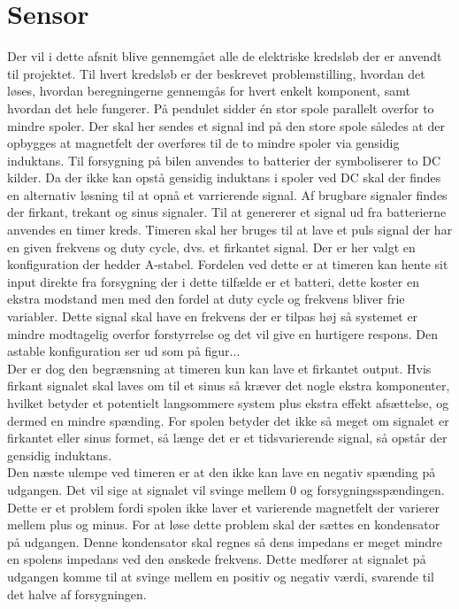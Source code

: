 \chapter{Sensor}\label{kap:chap_sensor}


Der vil i dette afsnit blive gennemgået alle de elektriske kredsløb der er anvendt til projektet. Til hvert kredsløb er der beskrevet problemstilling, hvordan det løses, hvordan beregningerne gennemgås for hvert enkelt komponent, samt hvordan det hele fungerer.
På pendulet sidder én stor spole parallelt overfor to mindre spoler. Der skal her sendes et signal ind på den store spole således at der opbygges at magnetfelt der overføres til de to mindre spoler via gensidig induktans. Til forsygning på bilen anvendes to batterier der symboliserer to DC kilder. Da der ikke kan opstå gensidig induktans i spoler ved DC skal der findes en alternativ løsning til at opnå et varrierende signal. Af brugbare signaler findes der firkant, trekant og sinus signaler.
Til at genererer et signal ud fra batterierne anvendes en timer kreds. Timeren skal her bruges til at lave et puls signal der har en given frekvens og duty cycle, dvs. et firkantet signal. Der er her valgt en konfiguration der hedder A-stabel. Fordelen ved dette er at timeren kan hente sit input direkte fra forsygning der i dette tilfælde er et batteri, dette koster en ekstra modstand men med den fordel at duty cycle og frekvens bliver frie variabler. Dette signal skal have en frekvens der er tilpas høj så systemet er mindre modtagelig overfor forstyrrelse og det vil give en hurtigere respons. Den astable konfiguration ser ud som på figur...\\

Der er dog den begrænsning at timeren kun kan lave et firkantet output. Hvis firkant signalet skal laves om til et sinus så kræver det nogle ekstra komponenter, hvilket betyder et potentielt langsommere system plus ekstra effekt afsættelse, og dermed en mindre spænding. For spolen betyder det ikke så meget om signalet er firkantet eller sinus formet, så længe det er et tidsvarierende signal, så opstår der gensidig induktans.\\

Den næste ulempe ved timeren er at den ikke kan lave en negativ spænding på udgangen. Det vil sige at signalet vil svinge mellem 0 og forsygningsspændingen. Dette er et problem fordi spolen ikke laver et varierende magnetfelt der varierer mellem plus og minus. For at løse dette problem skal der sættes en kondensator på udgangen. Denne kondensator skal regnes så dens impedans er meget mindre en spolens impedans ved den ønskede frekvens. Dette medfører at signalet på udgangen komme til at svinge mellem en positiv og negativ værdi, svarende til det halve af forsygningen.\\

